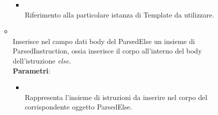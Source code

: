 \begin{itemize}
\begin{itemize}
\begin{itemize}
\item {}
\\ Riferimento alla particolare istanza di Template da utilizzare.
\end{itemize}
\item {}
\\ Inserisce nel campo dati body del ParsedElse un insieme di ParsedInstruction, ossia inserisce il corpo all'interno del body dell'istruzione \emph{else}.
\\ \textbf{Parametri}:
\begin{itemize}
\item {}
\\ Rappresenta l'insieme di istruzioni da inserire nel corpo del corrispondente oggetto ParsedElse.
\end{itemize}
\end{itemize}
\end{itemize}

